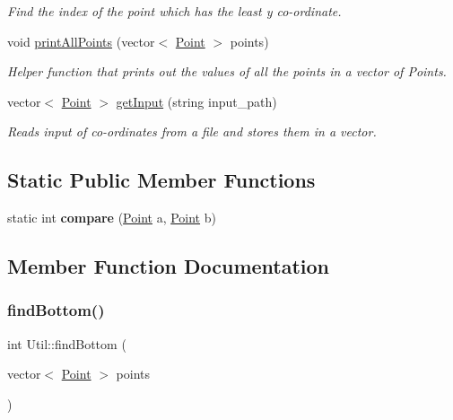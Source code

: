 \begin{DoxyCompactItemize}
\begin{DoxyCompactList}\small\item\em Find the index of the point which has the least y co-\/ordinate. \end{DoxyCompactList}\item 
void \hyperlink{classUtil_a178628de18adc2807d3a331a060e62a0}{print\+All\+Points} (vector$<$ \hyperlink{classPoint}{Point} $>$ points)
\begin{DoxyCompactList}\small\item\em Helper function that prints out the values of all the points in a vector of Points. \end{DoxyCompactList}\item 
vector$<$ \hyperlink{classPoint}{Point} $>$ \hyperlink{classUtil_a9d498a3fdcb57063895cd379f125e36c}{get\+Input} (string input\+\_\+path)
\begin{DoxyCompactList}\small\item\em Reads input of co-\/ordinates from a file and stores them in a vector. \end{DoxyCompactList}\end{DoxyCompactItemize}
\subsection*{Static Public Member Functions}
\begin{DoxyCompactItemize}
\item 
\mbox{\label{classUtil_a3848d2a1da246c09f8f900b75a689d7f}} 
static int {\bfseries compare} (\hyperlink{classPoint}{Point} a, \hyperlink{classPoint}{Point} b)
\end{DoxyCompactItemize}


\subsection{Member Function Documentation}
\mbox{\label{classUtil_a2aa1aedf21bb79a5cc6c13f138735834}} 
\subsubsection{\texorpdfstring{find\+Bottom()}{findBottom()}}
{\footnotesize\ttfamily int Util\+::find\+Bottom (\begin{DoxyParamCaption}\item[{vector$<$ \hyperlink{classPoint}{Point} $>$}]{points }\end{DoxyParamCaption})}



